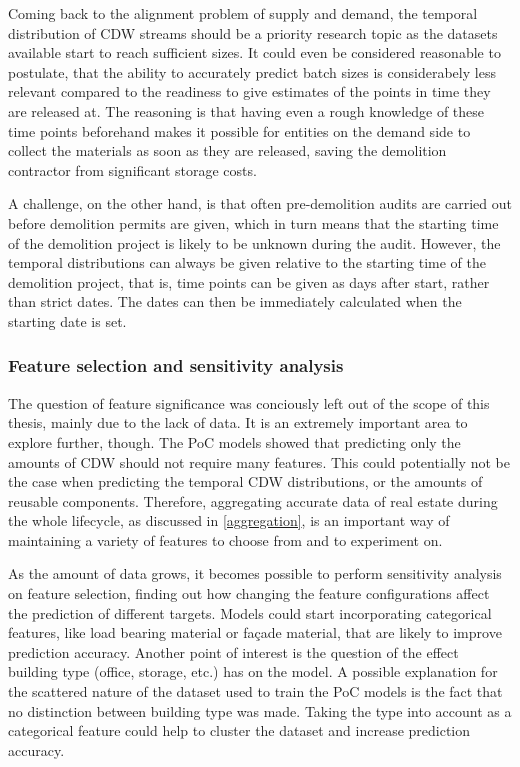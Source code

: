\documentclass[english, 12pt, a4paper, sci, utf8, a-2b, online]{aaltothesis}
\begin{document}
Coming back to the alignment problem of supply and demand, the temporal distribution of CDW streams should be a priority research topic as the datasets available start to reach sufficient sizes.
It could even be considered reasonable to postulate, that the ability to accurately predict batch sizes is considerabely less relevant compared to the readiness to give estimates of the points
in time they are released at. The reasoning is that having even a rough knowledge of these time points beforehand makes it possible for entities on the demand side to collect the materials as
soon as they are released, saving the demolition contractor from significant storage costs.

A challenge, on the other hand, is that often pre-demolition audits are carried out before demolition permits are given, which in
turn means that the starting time of the demolition project is likely to be unknown during the audit. However, the temporal distributions can always be given relative to the starting time of the
demolition project, that is, time points can be given as days after start, rather than strict dates. The dates can then be immediately calculated when the starting date is set.

\subsubsection{Feature selection and sensitivity analysis}

The question of feature significance was conciously left out of the scope of this thesis, mainly due to the lack of data. It is an extremely important area to explore further, though. The PoC models
showed that predicting only the amounts of CDW should not require many features. This could potentially not be the case when predicting the temporal CDW distributions, or the amounts of reusable
components. Therefore, aggregating accurate data of real estate during the whole lifecycle, as discussed in \ref{aggregation}, is an important way of maintaining a variety of features to choose
from and to experiment on.

As the amount of data grows, it becomes possible to perform sensitivity analysis on feature selection, finding out how changing the feature configurations affect the prediction of different targets.
Models could start incorporating categorical features, like load bearing material or façade material, that are likely to improve prediction accuracy. Another point of interest is the question
of the effect building type (office, storage, etc.) has on the model. A possible explanation for the scattered nature of the dataset used to train the PoC models is the fact that no distinction
between building type was made. Taking the type into account as a categorical feature could help to cluster the dataset and increase prediction accuracy.
\end{document}
